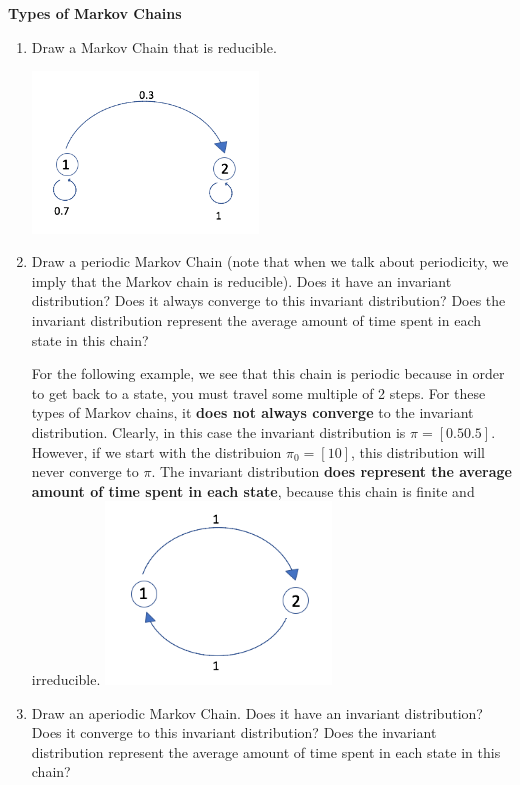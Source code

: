 \question \textbf{Types of Markov Chains}
\begin{enumerate}[label=(\alph*)]
\item Draw a Markov Chain that is reducible.
\begin{solution}[1.75cm]
\includegraphics[width=6cm]{reducible.png}
\end{solution}
\item Draw a periodic Markov Chain (note that when we talk about periodicity, we imply that the Markov chain is reducible). Does it have an invariant distribution? Does it always converge to this invariant distribution? Does the invariant distribution represent the average amount of time spent in each state in this chain? 
\begin{solution}[1.75cm]
For the following example, we see that this chain is periodic because in order to get back to a state, you must travel some multiple of 2 steps. For these types of Markov chains, it \textbf{does not always converge} to the invariant distribution. Clearly, in this case the invariant distribution is $\pi = [0.5 0.5]$. However, if we start with the distribuion $\pi_0 = [1 0]$, this distribution will never converge to $\pi$. The invariant distribution \textbf{does represent the average amount of time spent in each state}, because this chain is finite and irreducible. 
\includegraphics[width=6cm]{periodic.png}
\end{solution}
\item Draw an aperiodic Markov Chain. Does it have an invariant distribution? Does it converge to this
invariant distribution? Does the invariant distribution represent the average amount of time spent in each state in this chain? 

\end{enumerate}
